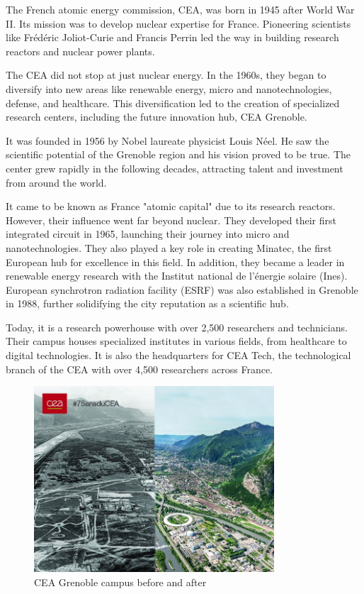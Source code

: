 \medskip

The French atomic energy commission, CEA, was born in 1945 after World War II. Its mission was to develop nuclear 
expertise for France. Pioneering scientists like Frédéric Joliot-Curie and Francis Perrin led the way in building 
research reactors and nuclear power plants.

\medskip

The CEA did not stop at just nuclear energy. In the 1960s, they began to diversify into new areas like renewable energy,
 micro and nanotechnologies, defense, and healthcare. This diversification led to the creation of specialized research
 centers, including the future innovation hub, CEA Grenoble.

\medskip

It was founded in 1956 by Nobel laureate physicist Louis Néel. He saw the scientific potential of the Grenoble
region and his vision proved to be true. The center grew rapidly in the following decades, attracting talent and investment
from around the world.

\medskip

It came to be known as France "atomic capital" due to its research reactors. However, their influence went far beyond
 nuclear. They developed their first integrated circuit in 1965, launching their journey into micro and nanotechnologies. 
 They also played a key role in creating Minatec, the first European hub for excellence in this field. In addition, they 
 became a leader in renewable energy research with the Institut national de l'énergie solaire (Ines).
 European synchrotron radiation facility (ESRF) was also established in Grenoble in 1988, further solidifying the city
 reputation as a scientific hub.
\medskip

Today, it is a research powerhouse with over 2,500 researchers and technicians. Their campus houses specialized
 institutes in various fields, from healthcare to digital technologies. It is also the headquarters for CEA Tech, the
 technological branch of the CEA with over 4,500 researchers across France.

\begin{figure}[h!]
    \centering
    \includegraphics[width=0.8\textwidth]{images/old_new.jpg}
    \caption{CEA Grenoble campus before and after}
\end{figure}

